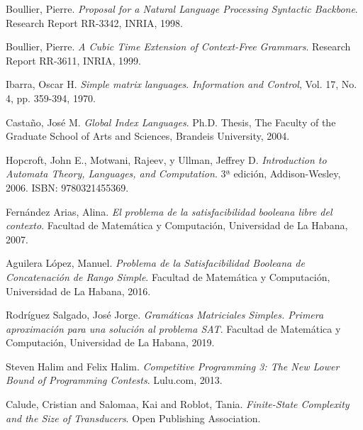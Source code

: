 \documentclass[12pt]{article}
\begin{document}
\begin{thebibliography}{99}
  
  Boullier, Pierre. 
  \textit{Proposal for a Natural Language Processing Syntactic Backbone}. 
  Research Report RR-3342, INRIA, 1998. 
  
  Boullier, Pierre. 
  \textit{A Cubic Time Extension of Context-Free Grammars}. 
  Research Report RR-3611, INRIA, 1999. 
  
  Ibarra, Oscar H. 
  \textit{Simple matrix languages}. 
  \textit{Information and Control}, Vol. 17, No. 4, pp. 359-394, 1970. 
  
  Castaño, José M. 
  \textit{Global Index Languages}. 
  Ph.D. Thesis, The Faculty of the Graduate School of Arts and Sciences, Brandeis University, 2004.
  
  Hopcroft, John E., Motwani, Rajeev, y Ullman, Jeffrey D. 
  \textit{Introduction to Automata Theory, Languages, and Computation}. 
  3ª edición, Addison-Wesley, 2006. ISBN: 9780321455369.
  
  Fernández Arias, Alina. 
  \textit{El problema de la satisfacibilidad booleana libre del contexto}. 
  Facultad de Matemática y Computación, Universidad de La Habana, 2007.
  
  Aguilera López, Manuel. 
  \textit{Problema de la Satisfacibilidad Booleana de Concatenación de Rango Simple}. 
  Facultad de Matemática y Computación, Universidad de La Habana, 2016.
  
  Rodríguez Salgado, José Jorge. 
  \textit{Gramáticas Matriciales Simples. Primera aproximación para una solución al problema SAT}. 
  Facultad de Matemática y Computación, Universidad de La Habana, 2019.
  
  Steven Halim and Felix Halim. 
  \textit{Competitive Programming 3: The New Lower Bound of Programming Contests}. 
  Lulu.com, 2013.
  
  Calude, Cristian and Salomaa, Kai and Roblot, Tania.
  \textit{Finite-State Complexity and the Size of Transducers}. 
  Open Publishing Association. 
  
  
  
\end{thebibliography}
\end{document}
